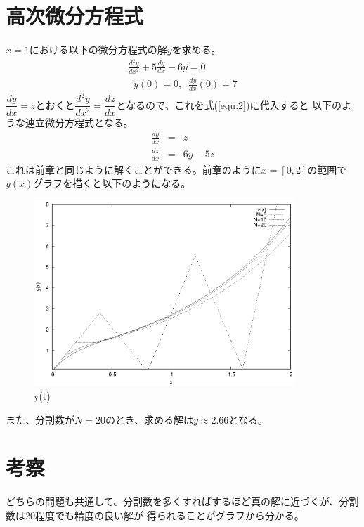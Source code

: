 \documentclass[titlepage]{jsarticle}
\begin{document}

\section{高次微分方程式}
	$x=1$における以下の微分方程式の解$y$を求める。
	\begin{eqnarray}
		\frac{d^2y}{dx^2}+5\frac{dy}{dx}-6y = 0 \label{equ:2} \\
		 \;\; y(0) = 0,\;\;\frac{dy}{dx}(0)=7 \nonumber
	\end{eqnarray}
	$\dfrac{dy}{dx} = z$とおくと$\dfrac{d^2y}{dx^2} = \dfrac{dz}{dx}$となるので、これを式(\ref{equ:2})に代入すると
	以下のような連立微分方程式となる。
	\begin{eqnarray}
		\frac{dy}{dx} &=& z \nonumber \\
		\frac{dz}{dx} &=&  6y -5z \nonumber
	\end{eqnarray}
	これは前章と同じように解くことができる。前章のように$x=[0,2]$の範囲で$y(x)$グラフを描くと以下のようになる。
	\begin{figure}[H]
		 \centering
		 \includegraphics[height=7cm]{2/y(t).eps}
		 \caption{y(t)}
		 \label{fig:2y(t)}
	\end{figure}
	また、分割数が$N=20$のとき、求める解は$y\approx 2.66$となる。
	
\section{考察}
	どちらの問題も共通して、分割数を多くすればするほど真の解に近づくが、分割数は20程度でも精度の良い解が
	得られることがグラフから分かる。
\end{document}

